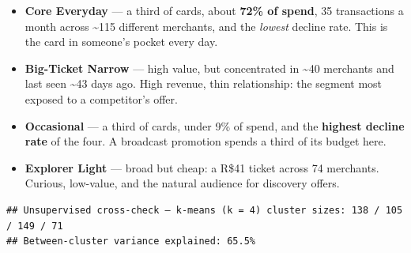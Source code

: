\documentclass[
]{article}
\newenvironment{Shaded}{\begin{snugshade}}{\end{snugshade}}
\newcommand{\AttributeTok}[1]{\textcolor[rgb]{0.13,0.29,0.53}{#1}}
\newcommand{\DecValTok}[1]{\textcolor[rgb]{0.00,0.00,0.81}{#1}}
\newcommand{\FloatTok}[1]{\textcolor[rgb]{0.00,0.00,0.81}{#1}}
\newcommand{\FunctionTok}[1]{\textcolor[rgb]{0.13,0.29,0.53}{\textbf{#1}}}
\newcommand{\NormalTok}[1]{#1}
\newcommand{\OtherTok}[1]{\textcolor[rgb]{0.56,0.35,0.01}{#1}}
\newcommand{\SpecialCharTok}[1]{\textcolor[rgb]{0.81,0.36,0.00}{\textbf{#1}}}
\newcommand{\StringTok}[1]{\textcolor[rgb]{0.31,0.60,0.02}{#1}}
\providecommand{\tightlist}{%
  \setlength{\itemsep}{0pt}\setlength{\parskip}{0pt}}
\begin{document}
\begin{itemize}
\tightlist
\item
  \textbf{Core Everyday} --- a third of cards, about \textbf{72\% of
  spend}, 35 transactions a month across \textasciitilde115 different
  merchants, and the \emph{lowest} decline rate. This is the card in
  someone's pocket every day.
\item
  \textbf{Big-Ticket Narrow} --- high value, but concentrated in
  \textasciitilde40 merchants and last seen \textasciitilde43 days ago.
  High revenue, thin relationship: the segment most exposed to a
  competitor's offer.
\item
  \textbf{Occasional} --- a third of cards, under 9\% of spend, and the
  \textbf{highest decline rate} of the four. A broadcast promotion
  spends a third of its budget here.
\item
  \textbf{Explorer Light} --- broad but cheap: a R\$41 ticket across 74
  merchants. Curious, low-value, and the natural audience for discovery
  offers.
\end{itemize}

\begin{Shaded}
\end{Shaded}

\begin{verbatim}
## Unsupervised cross-check — k-means (k = 4) cluster sizes: 138 / 105 / 149 / 71 
## Between-cluster variance explained: 65.5%
\end{verbatim}
\end{document}
